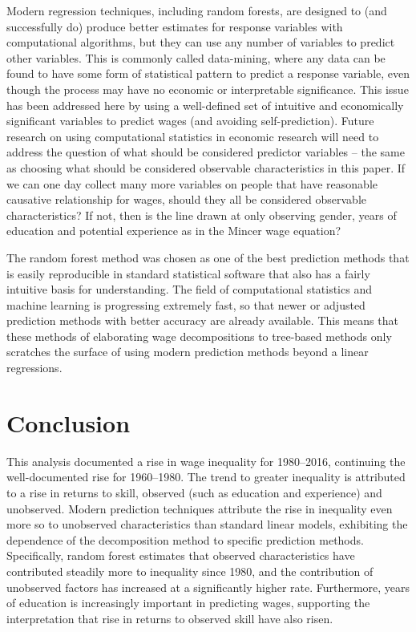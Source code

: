 \documentclass[notitlepage,12pt]{article}
\begin{document}
Modern regression techniques, including random forests, are designed to (and successfully do) produce better estimates for response variables with computational algorithms, but they can use any number of variables to predict other variables.  This is commonly called data-mining, where any data can be found to have some form of statistical pattern to predict a response variable, even though the process may have no economic or interpretable significance.  This issue has been addressed here by using a well-defined set of intuitive and economically significant variables to predict wages (and avoiding self-prediction).  Future research on using computational statistics in economic research will need to address the question of what should be considered predictor variables -- the same as choosing what should be considered observable characteristics in this paper.  If we can one day collect many more variables on people that have reasonable causative relationship for wages, should they all be considered observable characteristics?  If not, then is the line drawn at only observing gender, years of education and potential experience as in the Mincer wage equation?

The random forest method was chosen as one of the best prediction methods that is easily reproducible in standard statistical software that also has a fairly intuitive basis for understanding.  The field of computational statistics and machine learning is progressing extremely fast, so that newer or adjusted prediction methods with better accuracy are already available.  This means that these methods of elaborating wage decompositions to tree-based methods only scratches the surface of using modern prediction methods beyond a linear regressions.

\section{Conclusion}
This analysis documented a rise in wage inequality for 1980--2016, continuing the well-documented rise for 1960--1980.  The trend to greater inequality is attributed to a rise in returns to skill, observed (such as education and experience) and unobserved.  Modern prediction techniques attribute the rise in inequality even more so to unobserved characteristics than standard linear models, exhibiting the dependence of the \cite{juhn1993wage} decomposition method to specific prediction methods.  Specifically, random forest estimates that observed characteristics have contributed steadily more to inequality since 1980, and the contribution of unobserved factors has increased at a significantly higher rate.  Furthermore, years of education is increasingly important in predicting wages, supporting the interpretation that rise in returns to observed skill have also risen.
\end{document}
